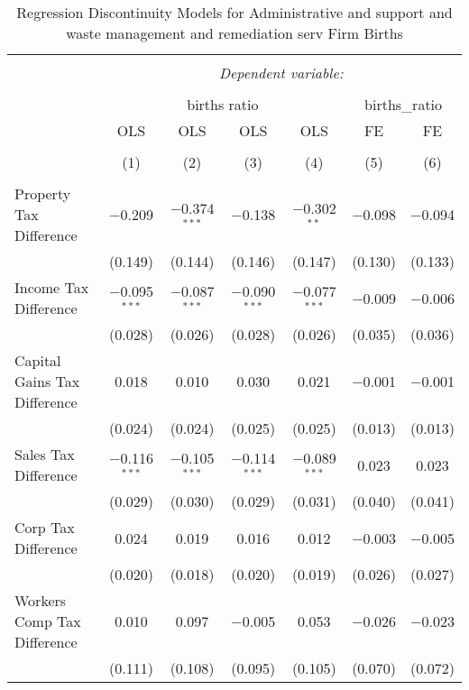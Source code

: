 
\begin{table}[!htbp] \centering 
  \caption{Regression Discontinuity Models for  Administrative and support and waste management and remediation serv Firm Births} 
  \label{56rd} 
\begin{tabular}{@{\extracolsep{5pt}}lcccccc} 
\\[-1.8ex]\hline 
\hline \\[-1.8ex] 
 & \multicolumn{6}{c}{\textit{Dependent variable:}} \\ 
\cline{2-7} 
\\[-1.8ex] & \multicolumn{4}{c}{births ratio} & \multicolumn{2}{c}{births\_ratio} \\ 
 & OLS & OLS & OLS & OLS & FE & FE \\ 
\\[-1.8ex] & (1) & (2) & (3) & (4) & (5) & (6)\\ 
\hline \\[-1.8ex] 
 Property Tax Difference & $-$0.209 & $-$0.374$^{***}$ & $-$0.138 & $-$0.302$^{**}$ & $-$0.098 & $-$0.094 \\ 
  & (0.149) & (0.144) & (0.146) & (0.147) & (0.130) & (0.133) \\ 
  Income Tax Difference & $-$0.095$^{***}$ & $-$0.087$^{***}$ & $-$0.090$^{***}$ & $-$0.077$^{***}$ & $-$0.009 & $-$0.006 \\ 
  & (0.028) & (0.026) & (0.028) & (0.026) & (0.035) & (0.036) \\ 
  Capital Gains Tax Difference & 0.018 & 0.010 & 0.030 & 0.021 & $-$0.001 & $-$0.001 \\ 
  & (0.024) & (0.024) & (0.025) & (0.025) & (0.013) & (0.013) \\ 
  Sales Tax Difference & $-$0.116$^{***}$ & $-$0.105$^{***}$ & $-$0.114$^{***}$ & $-$0.089$^{***}$ & 0.023 & 0.023 \\ 
  & (0.029) & (0.030) & (0.029) & (0.031) & (0.040) & (0.041) \\ 
  Corp Tax Difference & 0.024 & 0.019 & 0.016 & 0.012 & $-$0.003 & $-$0.005 \\ 
  & (0.020) & (0.018) & (0.020) & (0.019) & (0.026) & (0.027) \\ 
  Workers Comp Tax Difference & 0.010 & 0.097 & $-$0.005 & 0.053 & $-$0.026 & $-$0.023 \\ 
  & (0.111) & (0.108) & (0.095) & (0.105) & (0.070) & (0.072) \\ 

\end{tabular}
\end{table}
